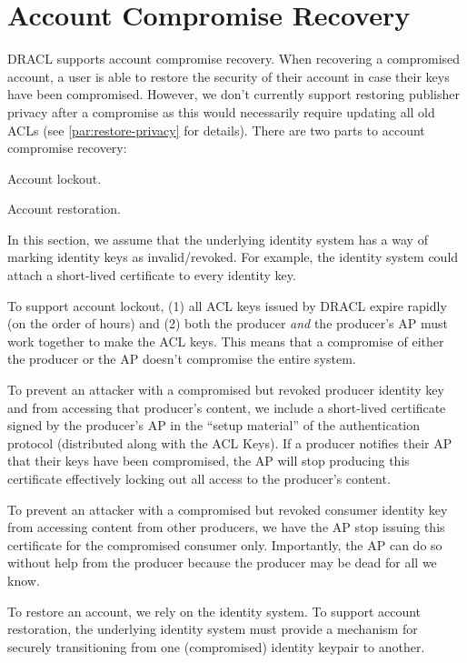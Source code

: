 \documentclass[pdftex,12pt,a4papaer,twoside,notitlepage]{report}
\begin{document}
\section{Account Compromise Recovery}
\label{sec:revoke}

DRACL supports account compromise recovery. When recovering a compromised
account, a user is able to restore the security of their account in case their
keys have been compromised. However, we don't currently support restoring
publisher privacy after a compromise as this would necessarily require updating
all old ACLs (see \cref{par:restore-privacy} for details). There are two parts
to account compromise recovery:

\begin{compactenum}
\item Account lockout.
\item Account restoration.
\end{compactenum}

In this section, we assume that the underlying identity system has a way of
marking identity keys as invalid/revoked. For example, the identity system could
attach a short-lived certificate to every identity key.

To support account lockout, (1) all ACL keys issued by DRACL expire rapidly (on
the order of hours) and (2) both the producer \emph{and} the producer's AP must
work together to make the ACL keys. This means that a compromise of either the
producer or the AP doesn't compromise the entire system.

To prevent an attacker with a compromised but revoked producer identity key and
from accessing that producer's content, we include a short-lived certificate
signed by the producer's AP in the ``setup material'' of the authentication
protocol (distributed along with the ACL Keys). If a producer notifies their AP
that their keys have been compromised, the AP will stop producing this
certificate effectively locking out all access to the producer's content.

To prevent an attacker with a compromised but revoked consumer identity key from
accessing content from other producers, we have the AP stop issuing this
certificate for the compromised consumer only. Importantly, the AP can do so
without help from the producer because the producer may be dead for all we know.

To restore an account, we rely on the identity system. To support account
restoration, the underlying identity system must provide a mechanism for
securely transitioning from one (compromised) identity keypair to another.
\end{document}
